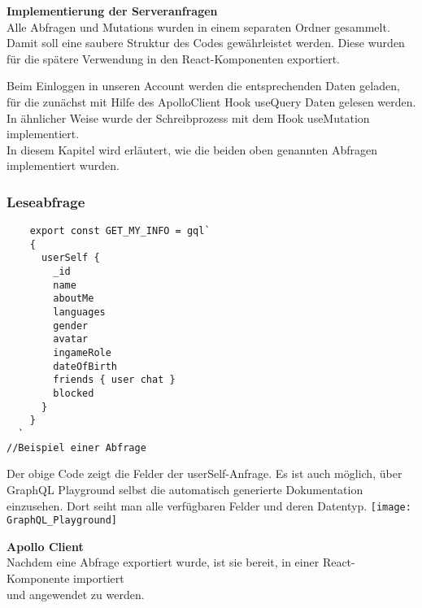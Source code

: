 \textbf{Implementierung der Serveranfragen}\\
Alle Abfragen und Mutations wurden in einem separaten Ordner gesammelt.
Damit soll eine saubere Struktur des Codes gewährleistet werden.
Diese wurden für die spätere Verwendung in den React-Komponenten exportiert.

Beim Einloggen in unseren Account werden die entsprechenden Daten geladen, für die zunächst mit Hilfe des ApolloClient Hook useQuery Daten gelesen werden.
In ähnlicher Weise wurde der Schreibprozess mit dem Hook useMutation implementiert.
\\
In diesem Kapitel wird erläutert, wie die beiden oben genannten Abfragen implementiert wurden.


\subsubsection{Leseabfrage} 
\begin{lstlisting}
    export const GET_MY_INFO = gql`
    {
      userSelf {
        _id
        name
        aboutMe
        languages
        gender
        avatar
        ingameRole
        dateOfBirth
        friends { user chat }        
        blocked
      }
    }
  `
//Beispiel einer Abfrage
\end{lstlisting}
Der obige Code zeigt die Felder der userSelf-Anfrage.
Es ist auch möglich, über GraphQL Playground selbst die automatisch generierte Dokumentation einzusehen. 
Dort seiht man alle verfügbaren Felder und deren Datentyp.
\texttt{[image: GraphQL\_Playground]}

\newpage
\textbf{Apollo Client}\\
Nachdem eine Abfrage exportiert wurde, ist sie bereit, in einer React-Komponente importiert \\ 
und angewendet zu werden.

